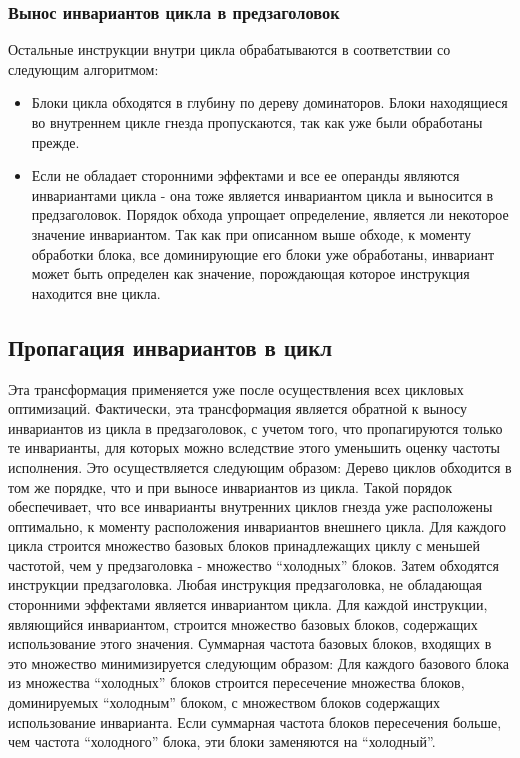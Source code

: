 \subsubsection{Вынос инвариантов цикла в предзаголовок}

Остальные инструкции внутри цикла обрабатываются в соответствии со следующим алгоритмом:
\begin{itemize}
    \item Блоки цикла обходятся в глубину по дереву доминаторов.
        Блоки находящиеся во внутреннем цикле гнезда пропускаются, так как уже были обработаны прежде.
    \item Если не обладает сторонними эффектами и все ее операнды являются инвариантами цикла - она тоже является инвариантом цикла и выносится в предзаголовок.
        Порядок обхода упрощает определение, является ли некоторое значение инвариантом.
        Так как при описанном выше обходе, к моменту обработки блока, все доминирующие его блоки уже обработаны, инвариант может быть определен как значение, порождающая которое инструкция находится вне цикла.
\end{itemize}

\subsection{Пропагация инвариантов в цикл}

Эта трансформация применяется уже после осуществления всех цикловых оптимизаций.
Фактически, эта трансформация является обратной к выносу инвариантов из цикла в предзаголовок, с учетом того, что пропагируются только те инварианты, для которых можно вследствие этого уменьшить оценку частоты исполнения.
Это осуществляется следующим образом:
Дерево циклов обходится в том же порядке, что и при выносе инвариантов из цикла.
Такой порядок обеспечивает, что все инварианты внутренних циклов гнезда уже расположены оптимально, к моменту расположения инвариантов внешнего цикла.
Для каждого цикла строится множество базовых блоков принадлежащих циклу с меньшей частотой, чем у предзаголовка - множество \enquote{холодных} блоков.
Затем обходятся инструкции предзаголовка.
Любая инструкция предзаголовка, не обладающая сторонними эффектами является инвариантом цикла.
Для каждой инструкции, являющийся инвариантом, строится множество базовых блоков, содержащих использование этого значения.
Суммарная частота базовых блоков, входящих в это множество минимизируется следующим образом:
Для каждого базового блока из множества \enquote{холодных} блоков строится пересечение множества блоков, доминируемых \enquote{холодным} блоком, с множеством блоков содержащих использование инварианта.
Если суммарная частота блоков пересечения больше, чем частота \enquote{холодного} блока, эти блоки заменяются на \enquote{холодный}.

